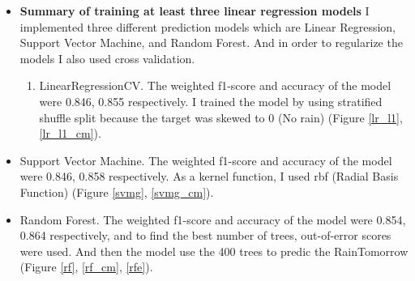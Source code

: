 \documentclass[12pt]{article}
\begin{document}
\begin{itemize}

\item \textbf{Summary of training at least three linear regression models} I implemented three different prediction models which are Linear Regression, Support Vector Machine, and Random Forest. And in order to regularize the models I also used cross validation.
    \begin{enumerate}
      \item LinearRegressionCV. The weighted f1-score and accuracy of the model were 0.846, 0.855 respectively. I trained the model by using stratified shuffle split because the target was skewed to 0 (No rain) (Figure \ref{lr_l1}, \ref{lr_l1_cm}).
    \end{enumerate}

    \begin{figure}[H]
      \centering
      \hfill
    \end{figure}

    \item Support Vector Machine. The weighted f1-score and accuracy of the model were 0.846, 0.858 respectively. As a kernel function, I used rbf (Radial Basis Function) (Figure \ref{svmg}, \ref{svmg_cm}).

    \begin{figure}[H]
      \centering
      \hfill
    \end{figure}

    \item Random Forest. The weighted f1-score and accuracy of the model were 0.854, 0.864 respectively, and to find the best number of trees, out-of-error scores were used. And then the model use the 400 trees to predic the RainTomorrow (Figure \ref{rf}, \ref{rf_cm}, \ref{rfe}).

    \begin{figure}[H]
      \centering
      \hfill
    \end{figure}


\end{itemize}
\end{document}
